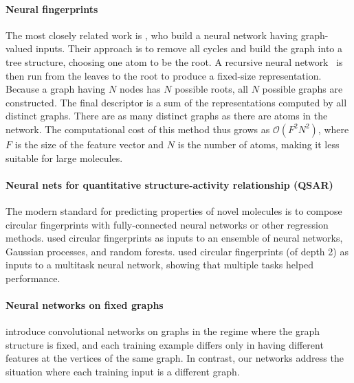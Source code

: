 \documentclass{article}
\newcommand{\citep}{\cite}
\newcommand{\citet}{\cite}
\begin{document}
\paragraph{Neural fingerprints}
The most closely related work is \citet{lusci2013deep}, who build a neural network having graph-valued inputs.
Their approach is to remove all cycles and build the graph into a tree structure, choosing one atom to be the root.
A recursive neural network~\citep{socher2011dynamic, socher2011semi} is then run from the leaves to the root to produce a fixed-size representation.
Because a graph having $N$ nodes has $N$ possible roots, all $N$ possible graphs are constructed.
The final descriptor is a sum of the representations computed by all distinct graphs.
There are as many distinct graphs as there are atoms in the network.
The computational cost of this method thus grows as $\mathcal{O}(F^2N^2)$, where $F$ is the size of the feature vector and $N$ is the number of atoms, making it less suitable for large molecules.

\paragraph{Neural nets for quantitative structure-activity relationship (QSAR)}
The modern standard for predicting properties of novel molecules is to compose circular fingerprints with fully-connected neural networks or other regression methods.
\cite{dahl2014multi} used circular fingerprints as inputs to an ensemble of neural networks, Gaussian processes, and random forests.
\cite{ramsundar2015massively} used circular fingerprints (of depth 2) as inputs to a multitask neural network, showing that multiple tasks helped performance.


\paragraph{Neural networks on fixed graphs}
\cite{bruna2013spectral} introduce convolutional networks on graphs in the regime where the graph structure is fixed, and each training example differs only in having different features at the vertices of the same graph.
In contrast, our networks address the situation where each training input is a different graph.
\end{document}
